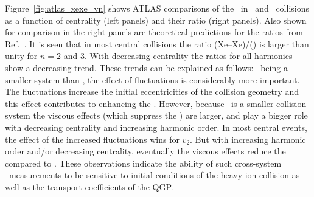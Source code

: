 Figure~\ref{fig:atlas_xexe_vn} shows ATLAS comparisons of the \vn\
  in \xexe\ and \pbpb\ collisions as a function of centrality (left panels)
  and their ratio (right panels).
Also shown for comparison in the right panels are theoretical predictions
  for the ratios from Ref.~\cite{Giacalone:2017dud}.
It is seen that in most central collisions the ratio \vn(Xe--Xe)/\vn(\pbpb) 
  is larger than unity for $n=2$ and 3.
With decreasing centrality the ratios for all harmonics show a decreasing trend.
These trends can be explained as follows:
  \xexe\ being a smaller system than \pbpb, the effect of fluctuations
  is considerably more important.
The fluctuations increase the initial eccentricities of the collision
  geometry and this effect contributes to enhancing the \vn.
However, because \xexe\ is a smaller collision system the viscous
  effects (which suppress the \vn) are larger, and play a bigger role
  with decreasing centrality and increasing harmonic order.
In most central events, the effect of the increased fluctuations wins
  for $v_2$.
But with increasing harmonic order and/or decreasing centrality, 
  eventually the viscous effects reduce the \vn compared to \pbpb.
These observations indicate the ability of such cross-system 
  \vn\ measurements to be sensitive to initial conditions of 
  the heavy ion collision as well as the transport coefficients
  of the QGP. 
